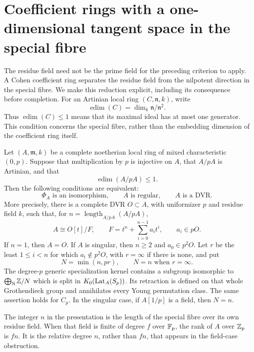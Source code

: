 \section{Coefficient rings with a one-dimensional tangent space in the special fibre}
\label{sec:curvilinear-special-fibre}

The residue field need not be the prime field for the preceding
criterion to apply.  A Cohen coefficient ring separates the residue
field from the nilpotent direction in the special fibre.  We make
this reduction explicit, including its consequence before completion.
For an Artinian local ring $(C,\mathfrak n,k)$, write
\[
 \operatorname{edim}(C)=\dim_k\mathfrak n/\mathfrak n^2.
\]
Thus $\operatorname{edim}(C)\leq1$ means that its maximal ideal
has at most one generator.  This condition concerns the special
fibre, rather than the embedding dimension of the coefficient ring
itself.

\begin{theorem}\label{thm:curvilinear-special-fibre}
Let $(A,\mathfrak m,k)$ be a complete noetherian local ring of mixed
characteristic $(0,p)$.  Suppose that multiplication by $p$ is
injective on $A$, that $A/pA$ is Artinian, and that
\[
 \operatorname{edim}(A/pA)\leq1.
\]
Then the following conditions are equivalent:
\[
 \Phi_A\text{ is an isomorphism},\qquad
 A\text{ is regular},\qquad A\text{ is a DVR}.
\]
More precisely, there is a complete DVR $O\subset A$, with
uniformizer $p$ and residue field $k$, such that, for
$n=\operatorname{length}_{A/pA}(A/pA)$,
\begin{equation}\label{eq:curvilinear-presentation}
 A\cong O[t]/F,\qquad
 F=t^n+\sum_{i=0}^{n-1}a_it^i,\qquad a_i\in pO.
\end{equation}
If $n=1$, then $A=O$.  If $A$ is singular, then $n\geq2$ and
$a_0\in p^2O$.  Let $r$ be the least $1\leq i<n$ for which
$a_i\notin p^2O$, with $r=\infty$ if there is none, and put
\[
 N=\min(n,pr),\qquad N=n\text{ when }r=\infty.
\]
The degree-$p$ generic specialization kernel contains a subgroup
isomorphic to $\bigoplus_{\mathbb N}\mathbb Z/N$ which is split in
$K_0(\operatorname{Lat}_A(S_p))$.  Its retraction is defined on that whole
Grothendieck group and annihilates every Young permutation class.
The same assertion holds for $C_p$.  In the singular case, if $A[1/p]$ is a field,
then $N=n$.
\end{theorem}

The integer $n$ in the presentation is the length of the special
fibre over its own residue field.  When that field is finite of
degree $f$ over $\mathbb F_p$, the rank of $A$ over $\mathbb Z_p$ is $fn$.
It is the relative degree $n$, rather than $fn$, that appears in
the field-case obstruction.

